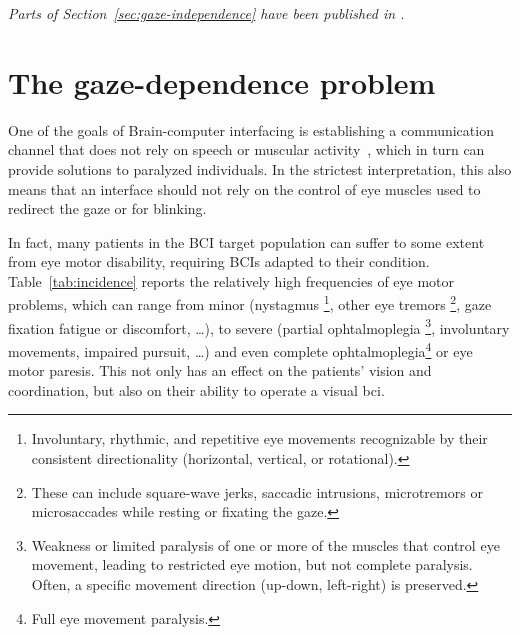 \emph{Parts of Section~\ref{sec:gaze-independence} have been published in \textcite{VanDenKerchove2024}.}


\section{The gaze-dependence problem}
\label{sec:gaze-dependence}


One of the goals of Brain-computer interfacing is establishing a communication
channel that does not rely on speech or muscular activity~\cite{Naci2012,Chaudhary2016},
which in turn can provide solutions to paralyzed individuals.
In the strictest interpretation, this also means that an interface should not
rely on the control of eye muscles used to redirect the gaze or for blinking.

In fact, many patients in the BCI target population can suffer to some extent
from eye motor disability, requiring BCIs adapted to their condition.
Table~\ref{tab:incidence} reports the relatively high frequencies of
eye motor problems, which can range from minor (nystagmus
\footnote{
Involuntary, rhythmic, and repetitive eye movements recognizable by their
consistent directionality (horizontal, vertical, or rotational).
}, other eye tremors
\footnote{
These can include square-wave jerks, saccadic intrusions, microtremors or
microsaccades while resting or fixating the gaze.
}, gaze fixation fatigue or discomfort, \ldots), to severe (partial ophtalmoplegia
\footnote{
Weakness or limited paralysis of one or more of the muscles that control eye
movement, leading to restricted eye motion, but not complete paralysis.
Often, a specific movement direction (up-down, left-right) is preserved.
}, involuntary movements, impaired pursuit, \ldots) and even complete
ophtalmoplegia\footnote{Full eye movement paralysis.} or eye motor paresis.
This not only has an effect on the patients' vision and coordination, but also
on their ability to operate a visual \ac{bci}.

